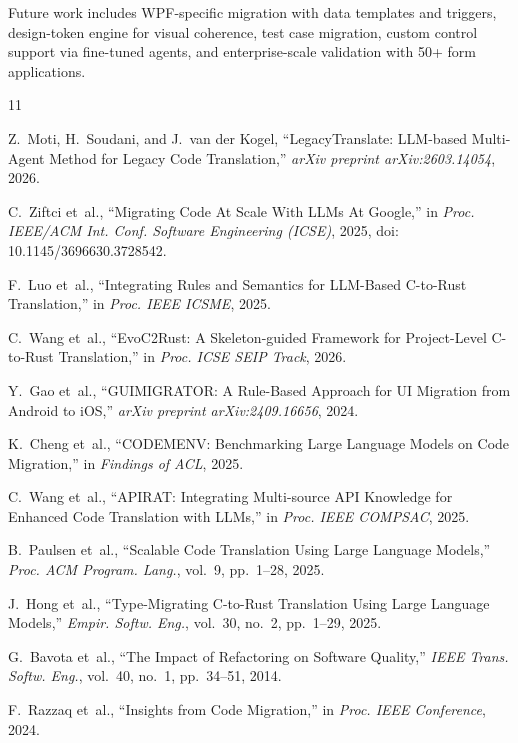 \documentclass[conference]{IEEEtran}
\begin{document}
Future work includes WPF-specific migration with data templates and triggers, design-token engine for visual coherence, test case migration, custom control support via fine-tuned agents, and enterprise-scale validation with 50+ form applications.



\begin{thebibliography}{11}

Z.~Moti, H.~Soudani, and J.~van der Kogel, ``LegacyTranslate: LLM-based Multi-Agent Method for Legacy Code Translation,'' \textit{arXiv preprint arXiv:2603.14054}, 2026.

C.~Ziftci et~al., ``Migrating Code At Scale With LLMs At Google,'' in \textit{Proc. IEEE/ACM Int. Conf. Software Engineering (ICSE)}, 2025, doi: 10.1145/3696630.3728542.

F.~Luo et~al., ``Integrating Rules and Semantics for LLM-Based C-to-Rust Translation,'' in \textit{Proc. IEEE ICSME}, 2025.

C.~Wang et~al., ``EvoC2Rust: A Skeleton-guided Framework for Project-Level C-to-Rust Translation,'' in \textit{Proc. ICSE SEIP Track}, 2026.

Y.~Gao et~al., ``GUIMIGRATOR: A Rule-Based Approach for UI Migration from Android to iOS,'' \textit{arXiv preprint arXiv:2409.16656}, 2024.

K.~Cheng et~al., ``CODEMENV: Benchmarking Large Language Models on Code Migration,'' in \textit{Findings of ACL}, 2025.

C.~Wang et~al., ``APIRAT: Integrating Multi-source API Knowledge for Enhanced Code Translation with LLMs,'' in \textit{Proc. IEEE COMPSAC}, 2025.

B.~Paulsen et~al., ``Scalable Code Translation Using Large Language Models,'' \textit{Proc. ACM Program. Lang.}, vol.~9, pp.~1--28, 2025.

J.~Hong et~al., ``Type-Migrating C-to-Rust Translation Using Large Language Models,'' \textit{Empir. Softw. Eng.}, vol.~30, no.~2, pp.~1--29, 2025.

G.~Bavota et~al., ``The Impact of Refactoring on Software Quality,'' \textit{IEEE Trans. Softw. Eng.}, vol.~40, no.~1, pp.~34--51, 2014.

F.~Razzaq et~al., ``Insights from Code Migration,'' in \textit{Proc. IEEE Conference}, 2024.

\end{thebibliography}
\end{document}

